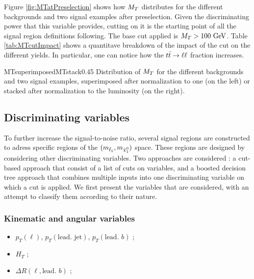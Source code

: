     Figure \ref{fig:MTatPreselection} shows how $M_T$ distributes for the different backgrounds and
    two signal examples after preselection. Given the discriminating power that this variable provides,
    cutting on it is the starting point of all the signal region definitions following. The base cut
    applied is $M_T > 100 ~\text{GeV}$. Table \ref{tab:MTcutImpact} shows a quantitave breakdown of the impact
    of the cut on the different yields. In particular, one can notice how the $t\bar{t} \rightarrow \ell \ell$ fraction increases.

                     {MTsuperimposed}{MTstack}{0.45}
                     {Distribution of $M_T$ for the different backgrounds and two signal examples,
                     superimposed after normalization to one (on the left) or stacked after normalization to the luminosity (on the right).}


        \subsection{Discriminating variables}

        To further increase the signal-to-noise ratio, several signal regions are constructed to adress
        specific regions of the $(m_{\tilde{t}_1},m_{\tilde{\chi}_1^0})$ space. These regions are designed
        by considering other discriminating variables. Two approaches are considered : a cut-based approach
        that consist of a list of cuts on variables, and a boosted decision tree approach that combines
        multiple inputs into one discriminating variable on which a cut is applied. We first present the
        variables that are considered, with an attempt to classify them according to their nature.

           \subsubsection{Kinematic and angular variables}

                \begin{itemize}
                    \item $p_T(\ell)$, $p_T(\text{lead. jet})$, $p_T(\text{lead. } b)$ ;
                    \item $H_T$ ;
                    \item $\Delta R( \ell, \text{lead. } b)$ ;
                \end{itemize}

